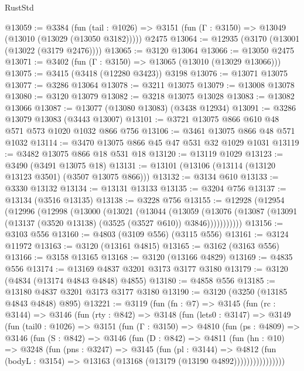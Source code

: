 \begin{lexlean}{RustStd}
\begin{coremodule}
{\begin{coremodule}
{{{{{{{{{{{{{{{{{{{{{{{{{{@13059 := @3384
    (fun (tail : @1026) => @3151 (fun (Γ : @3150) => @13049 (@13010 (@13029 (@13050 @3182)))))
    @2475
@13064 := @12935 (@3170 (@13001 (@13022 (@3179 @2476))))
@13065 := @3120 @13064
@13066 := @13050 @2475
@13071 := @3402 (fun (Γ : @3150) => @13065 (@13010 (@13029 @13066)))
@13075 := @3415 (@3418 (@12280 @3423)) @3198
@13076 := @13071 @13075
@13077 := @3286 @13064
@13078 := @3211 @13075
@13079 := @13008 @13078
@13080 := @3120 @13079
@13082 := @3218 @13075 @13028
@13083 := @13082 @13066
@13087 := @13077 (@13080 @13083) (@3438 @12934)
@13091 := @3286 @13079 @13083 (@3443 @13007)
@13101 := @3721 @13075 @866 @610 @48 @571 @573 @1020 @1032 @866 @756
@13106 := @3461 @13075 @866 @48 @571 @1032
@13114 := @3470 @13075 @866 @45 @47 @531 @32 @1029 @1031
@13119 := @3482 @13075 @866 @18 @531 @18
@13120 := @13119 @1029
@13123 := @3490 (@3491 @13075 @18)
@13131 := @13101 (@13106 (@13114 (@13120 @13123 @3501) (@3507 @13075 @866)))
@13132 := @3134 @610
@13133 := @3330 @13132
@13134 := @13131 @13133
@13135 := @3204 @756
@13137 := @13134 (@3516 @13135)
@13138 := @3228 @756
@13155 := @12928
    (@12954
      (@12996
        (@12998
          (@13000
            (@13021
              (@13044
                (@13059
                  (@13076
                    (@13087 (@13091 (@13137 (@3520 @13138) (@3525 (@3527 @610)) @3846)))))))))))
@13156 := @3103 @556
@13160 := @4803 (@3109 @556) (@3115 @556)
@13161 := @3124 @11972
@13163 := @3120 (@13161 @4815)
@13165 := @3162 (@3163 @556)
@13166 := @3158 @13165
@13168 := @3120 (@13166 @4829)
@13169 := @4835 @556
@13174 := @13169 @4837 @3201 @3173 @3177 @3180
@13179 := @3120 (@4834 (@13174 @4843 @4848) @4855)
@13180 := @4858 @556
@13185 := @13180 @4837 @3201 @3173 @3177 @3180
@13190 := @3120 (@3250 (@13185 @4843 @4848) @895)
@13221 := @3119
    (fun (fn : @7) =>
    @3145
      (fun (rc : @3144) =>
      @3146
        (fun (rty : @842) =>
        @3148
          (fun (lets0 : @3147) =>
          @3149
            (fun (tail0 : @1026) =>
            @3151
              (fun (Γ : @3150) =>
              @4810
                (fun (ps : @4809) =>
                @3146
                  (fun (S : @842) =>
                  @3146
                    (fun (D : @842) =>
                    @4811
                      (fun (hn : @10) =>
                      @3248
                        (fun (pns : @3247) =>
                        @3145
                          (fun (pl : @3144) =>
                          @4812
                            (fun (bodyL : @3154) =>
                            @13163 (@13168 (@13179 (@13190 @4892))))))))))))))))
}}}}}}}}}}}}}}}}}}}}}}}}}}
\end{coremodule}}
\end{coremodule}
\end{lexlean}

